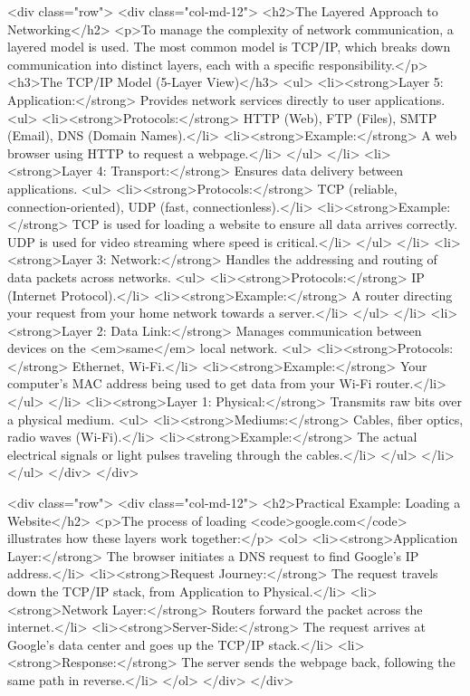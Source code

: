 \documentclass{article}
\begin{document}
\begin{itemize}
  <div class="row">
    <div class="col-md-12">
      <h2>The Layered Approach to Networking</h2>
      <p>To manage the complexity of network communication, a layered model is used. The most common model is TCP/IP, which breaks down communication into distinct layers, each with a specific responsibility.</p>
      <h3>The TCP/IP Model (5-Layer View)</h3>
      <ul>
        <li><strong>Layer 5: Application:</strong> Provides network services directly to user applications.
          <ul>
            <li><strong>Protocols:</strong> HTTP (Web), FTP (Files), SMTP (Email), DNS (Domain Names).</li>
            <li><strong>Example:</strong> A web browser using HTTP to request a webpage.</li>
          </ul>
        </li>
        <li><strong>Layer 4: Transport:</strong> Ensures data delivery between applications.
          <ul>
            <li><strong>Protocols:</strong> TCP (reliable, connection-oriented), UDP (fast, connectionless).</li>
            <li><strong>Example:</strong> TCP is used for loading a website to ensure all data arrives correctly. UDP is used for video streaming where speed is critical.</li>
          </ul>
        </li>
        <li><strong>Layer 3: Network:</strong> Handles the addressing and routing of data packets across networks.
          <ul>
            <li><strong>Protocols:</strong> IP (Internet Protocol).</li>
            <li><strong>Example:</strong> A router directing your request from your home network towards a server.</li>
          </ul>
        </li>
        <li><strong>Layer 2: Data Link:</strong> Manages communication between devices on the <em>same</em> local network.
          <ul>
            <li><strong>Protocols:</strong> Ethernet, Wi-Fi.</li>
            <li><strong>Example:</strong> Your computer's MAC address being used to get data from your Wi-Fi router.</li>
          </ul>
        </li>
        <li><strong>Layer 1: Physical:</strong> Transmits raw bits over a physical medium.
          <ul>
            <li><strong>Mediums:</strong> Cables, fiber optics, radio waves (Wi-Fi).</li>
            <li><strong>Example:</strong> The actual electrical signals or light pulses traveling through the cables.</li>
          </ul>
        </li>
      </ul>
    </div>
  </div>

  <div class="row">
    <div class="col-md-12">
      <h2>Practical Example: Loading a Website</h2>
      <p>The process of loading <code>google.com</code> illustrates how these layers work together:</p>
      <ol>
        <li><strong>Application Layer:</strong> The browser initiates a DNS request to find Google's IP address.</li>
        <li><strong>Request Journey:</strong> The request travels down the TCP/IP stack, from Application to Physical.</li>
        <li><strong>Network Layer:</strong> Routers forward the packet across the internet.</li>
        <li><strong>Server-Side:</strong> The request arrives at Google's data center and goes up the TCP/IP stack.</li>
        <li><strong>Response:</strong> The server sends the webpage back, following the same path in reverse.</li>
      </ol>
    </div>
  </div>


\end{itemize}
\end{document}
